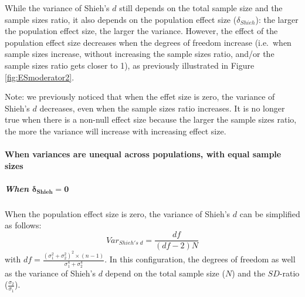 \documentclass[
  english,
  man,mask]{apa6}
\let\oldparagraph\paragraph
\renewcommand{\paragraph}[1]{\oldparagraph{#1}\mbox{}}
\let\oldsubparagraph\subparagraph
\renewcommand{\subparagraph}[1]{\oldsubparagraph{#1}\mbox{}}
\begin{document}
While the variance of Shieh's \(d\) still depends on the total sample size and the sample sizes ratio, it also depends on the population effect size (\(\delta_{Shieh}\)): the larger the population effect size, the larger the variance. However, the effect of the population effect size decreases when the degrees of freedom increase (i.e.~when sample sizes increase, without increasing the sample sizes ratio, and/or the sample sizes ratio gets closer to 1), as previously illustrated in Figure \ref{fig:ESmoderator2}.

Note: we previously noticed that when the effet size is zero, the variance of Shieh's \(d\) decreases, even when the sample sizes ratio increases. It is no longer true when there is a non-null effect size because the larger the sample sizes ratio, the more the variance will increase with increasing effect size.

\hypertarget{when-variances-are-unequal-across-populations-with-equal-sample-sizes-4}{%
\paragraph{When variances are unequal across populations, with equal sample sizes}\label{when-variances-are-unequal-across-populations-with-equal-sample-sizes-4}}

\hypertarget{when-bmdelta_shieh-0-1}{%
\subparagraph{\texorpdfstring{When \(\bm{\delta_{Shieh} = 0}\)}{When \textbackslash bm\{\textbackslash delta\_\{Shieh\} = 0\}}}\label{when-bmdelta_shieh-0-1}}

When the population effect size is zero, the variance of Shieh's \(d\) can be simplified as follows:
\[Var_{Shieh's \; d} = \frac{df}{(df-2)N}\]
with \(df = \frac{(\sigma_1^2+\sigma_2^2)^2 \times (n-1)}{\sigma_1^4+\sigma_2^4}\). In this configuration, the degrees of freedom as well as the variance of Shieh's \(d\) depend on the total sample size (\(N\)) and the \(SD\)-ratio (\(\frac{\sigma_2}{\sigma_1}\)).
\end{document}

